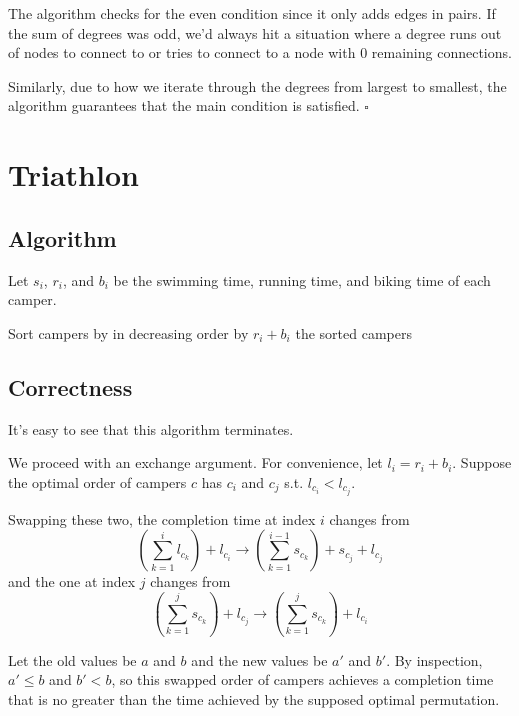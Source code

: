 \documentclass[12pt]{article}
\begin{document}
The algorithm checks for the even condition since it only adds edges in pairs.
If the sum of degrees was odd, we'd always hit a situation where a degree
runs out of nodes to connect to or tries to connect to a node with $0$ remaining connections.

Similarly, due to how we iterate through the degrees from largest to smallest,
the algorithm guarantees that the main condition is satisfied. $\square$

\pagebreak

\section{Triathlon}

\subsection{Algorithm}

Let $s_i$, $r_i$, and $b_i$ be the swimming time, running time,
and biking time of each camper.

\begin{algorithmic}[1]
    \State Sort campers by in decreasing order by $r_i+b_i$
    \State \Return the sorted campers
\end{algorithmic}

\subsection{Correctness}

It's easy to see that this algorithm terminates.

We proceed with an exchange argument.
For convenience, let $l_i=r_i+b_i$.
Suppose the optimal order of campers $c$ has $c_i$ and $c_j$ s.t. $l_{c_i} < l_{c_j}$.

Swapping these two, the completion time at index $i$ changes from
\[\left(\sum_{k=1}^{i} l_{c_k}\right)+l_{c_i} \to \left(\sum_{k=1}^{i-1} s_{c_k}\right)+s_{c_j}+l_{c_j}\]
and the one at index $j$ changes from
\[\left(\sum_{k=1}^{j} s_{c_k}\right)+l_{c_j} \to \left(\sum_{k=1}^{j} s_{c_k}\right)+l_{c_i}\]

Let the old values be $a$ and $b$ and the new values be $a'$ and $b'$.
By inspection, $a' \le b$ and $b'<b$, so this swapped order of campers
achieves a completion time that is no greater than the time achieved by the supposed optimal permutation.
\end{document}
